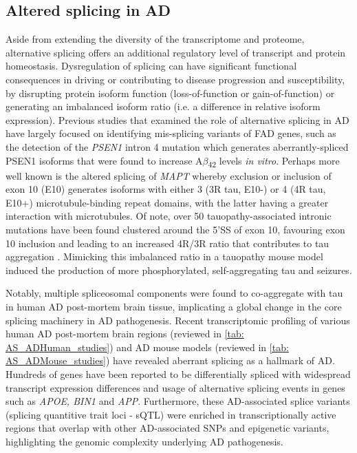 \newpage
\subsection{Altered splicing in AD}\label{intro:AD_alteredsplicing}
Aside from extending the diversity of the transcriptome and proteome, alternative splicing offers an additional regulatory level of transcript and protein homeostasis. Dysregulation of splicing can have significant functional consequences in driving or contributing to disease progression and susceptibility, by disrupting protein isoform function (loss-of-function or gain-of-function) or generating an imbalanced isoform ratio (i.e. a difference in relative isoform expression). Previous studies that examined the role of alternative splicing in AD have largely focused on identifying mis-splicing variants of FAD genes, such as the detection of the \textit{PSEN1} intron 4 mutation which generates aberrantly-spliced PSEN1 isoforms that were found to increase A$\beta$\textsubscript{42} levels \textit{in vitro}\cite{DeJonghe1999}. Perhaps more well known is the altered splicing of \textit{MAPT} whereby exclusion or inclusion of exon 10 (E10) generates isoforms with either 3 (3R tau, E10-) or 4 (4R tau, E10+) microtubule-binding repeat domains, with the latter having a greater interaction with microtubules. Of note, over 50 tauopathy-associated intronic mutations have been found clustered around the 5'SS of exon 10, favouring exon 10 inclusion \cite{DSouza1999, Ghetti2015} and leading to an increased 4R/3R ratio that contributes to tau aggregation \cite{Adams2010}. Mimicking this imbalanced ratio in a tauopathy mouse model induced the production of more phosphorylated, self-aggregating tau and seizures\cite{Schoch2016}.  

Notably, multiple spliceosomal components were found to co-aggregate with tau in human AD post-mortem brain tissue\cite{Bai2013}, implicating a global change in the core splicing machinery in AD pathogenesis. Recent transcriptomic profiling of various human AD post-mortem brain regions (reviewed in \cref{tab: AS_ADHuman_studies}) and AD mouse models (reviewed in \cref{tab: AS_ADMouse_studies}) have revealed aberrant splicing as a hallmark of AD. Hundreds of genes have been reported to be differentially spliced with widespread transcript expression differences and usage of alternative splicing events in genes such as \textit{APOE, BIN1} and \textit{APP}\cite{Marques-Coelho2021, Raj2018}. Furthermore, these AD-associated splice variants (splicing quantitive trait loci - sQTL) were enriched in transcriptionally active regions that overlap with other AD-associated SNPs and epigenetic variants, highlighting the genomic complexity underlying AD pathogenesis.  

